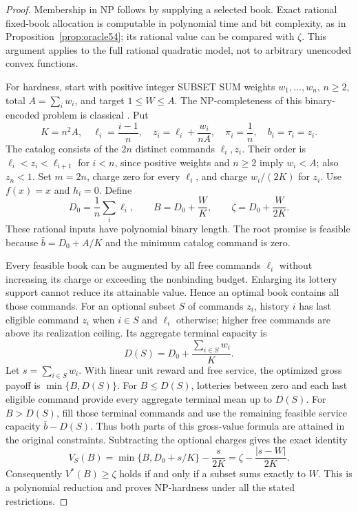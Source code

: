 \begin{proof}
Membership in NP follows by supplying a selected book. Exact rational fixed-book allocation is computable in polynomial time and bit complexity, as in Proposition~\ref{prop:oracle54}; its rational value can be compared with $\zeta$. This argument applies to the full rational quadratic model, not to arbitrary unencoded convex functions.

For hardness, start with positive integer SUBSET SUM weights $w_1,\ldots,w_n$, $n\geq2$, total $A=\sum_iw_i$, and target $1\leq W\leq A$. The NP-completeness of this binary-encoded problem is classical \citep{Karp1972}. Put
\begin{equation}\label{eq:reduction54}
 K=n^2A,\quad \ell_i=\frac{i-1}{n},\quad z_i=\ell_i+\frac{w_i}{nA},\quad
 \pi_i=\frac1n,\quad b_i=\tau_i=z_i.
\end{equation}
The catalog consists of the $2n$ distinct commands $\ell_i,z_i$. Their order is $\ell_i<z_i<\ell_{i+1}$ for $i<n$, since positive weights and $n\geq2$ imply $w_i<A$; also $z_n<1$. Set $m=2n$, charge zero for every $\ell_i$, and charge $w_i/(2K)$ for $z_i$. Use $f(x)=x$ and $h_i=0$. Define
\begin{equation}\label{eq:targetreduction54}
 D_0=\frac1n\sum_i\ell_i,\qquad B=D_0+\frac WK,
 \qquad \zeta=D_0+\frac W{2K}.
\end{equation}
These rational inputs have polynomial binary length. The root promise is feasible because $\bar b=D_0+A/K$ and the minimum catalog command is zero.

Every feasible book can be augmented by all free commands $\ell_i$ without increasing its charge or exceeding the nonbinding budget. Enlarging its lottery support cannot reduce its attainable value. Hence an optimal book contains all those commands. For an optional subset $S$ of commands $z_i$, history $i$ has last eligible command $z_i$ when $i\in S$ and $\ell_i$ otherwise; higher free commands are above its realization ceiling. Its aggregate terminal capacity is
\[
 D(S)=D_0+\frac{\sum_{i\in S}w_i}{K}.
\]
Let $s=\sum_{i\in S}w_i$. With linear unit reward and free service, the optimized gross payoff is $\min\{B,D(S)\}$. For $B\leq D(S)$, lotteries between zero and each last eligible command provide every aggregate terminal mean up to $D(S)$. For $B>D(S)$, fill those terminal commands and use the remaining feasible service capacity $\bar b-D(S)$. Thus both parts of this gross-value formula are attained in the original constraints. Subtracting the optional charges gives the exact identity
\begin{equation}\label{eq:distance54}
 V_S(B)=\min\{B,D_0+s/K\}-\frac{s}{2K}
       =\zeta-\frac{|s-W|}{2K}.
\end{equation}
Consequently $V^*(B)\geq\zeta$ holds if and only if a subset sums exactly to $W$. This is a polynomial reduction and proves NP-hardness under all the stated restrictions.
\end{proof}

